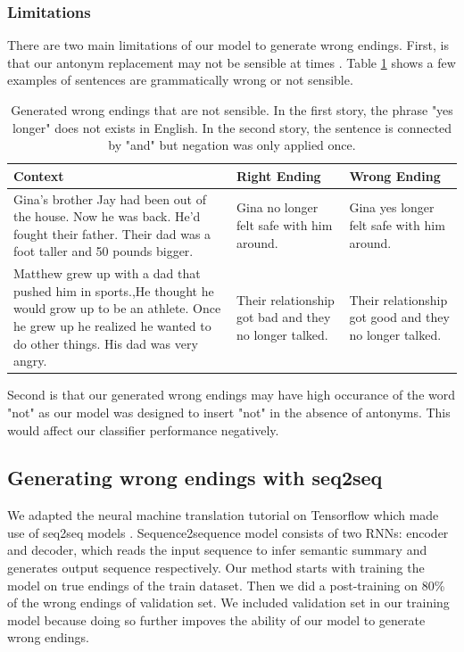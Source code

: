 \documentclass{article}
\begin{document}
\subsubsection{Limitations}
There are two main limitations of our model to generate wrong endings. First, is that our antonym replacement may not be sensible at times \citep{wordnet}. Table \ref{Tab:strange} shows a few examples of sentences are grammatically wrong or not sensible.

\begin{table}[h]\footnotesize
  \centering
  \begin{tabular}{ p{6cm} p{3cm} p{3cm} }
    \toprule
    Context & Right Ending & Wrong Ending \\
    \midrule
    Gina's brother Jay had been out of the house. Now he was back. He'd fought their father. Their dad was a foot taller and 50 pounds bigger. & Gina no longer felt safe with him around. & Gina yes longer felt safe with him around.\\
    \hline
    Matthew grew up with a dad that pushed him in sports.,He thought he would grow up to be an athlete. Once he grew up he realized he wanted to do other things. His dad was very angry. & Their relationship got bad and they no longer talked. & Their relationship got good and they no longer talked. \\
  \bottomrule

  \end{tabular}
  \label{Tab:strange}
  \caption{Generated wrong endings that are not sensible. In the first story, the phrase "yes longer" does not exists in English. In the second story, the sentence is connected by "and" but negation was only applied once.}
\end{table}

Second is that our generated wrong endings may have high occurance of the word "not" as our model was designed to insert "not" in the absence of antonyms. This would affect our classifier performance negatively.

\subsection{Generating wrong endings with seq2seq}
We adapted the neural machine translation tutorial on Tensorflow which made use of seq2seq models \cite{tfseq2seq}. Sequence2sequence model consists of two RNNs: encoder and decoder, which reads the  input sequence to infer semantic summary and generates output sequence respectively. Our method starts with training the model on true endings of the train dataset. Then we did a post-training on 80\% of the wrong endings of validation set. We included validation set in our training model because doing so further impoves the ability of our model to generate wrong endings.
\end{document}
